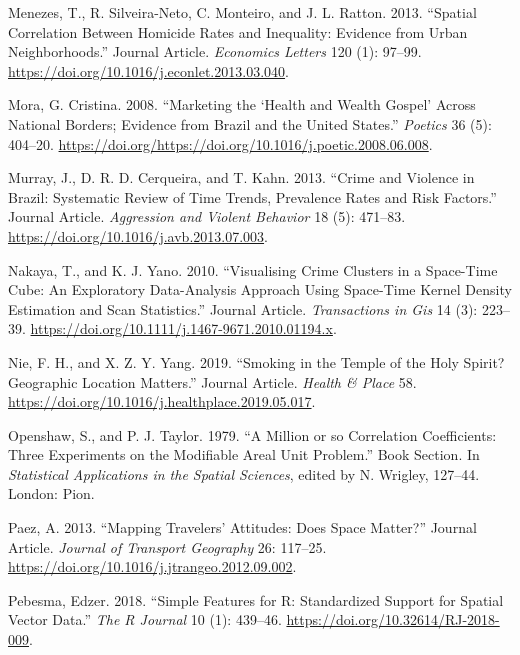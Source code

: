 \documentclass[smallextended]{svjour3}       %
\begin{document}
\leavevmode\hypertarget{ref-Menezes2013spatial}{}%
Menezes, T., R. Silveira-Neto, C. Monteiro, and J. L. Ratton. 2013.
``Spatial Correlation Between Homicide Rates and Inequality: Evidence
from Urban Neighborhoods.'' Journal Article. \emph{Economics Letters}
120 (1): 97--99. \url{https://doi.org/10.1016/j.econlet.2013.03.040}.

\leavevmode\hypertarget{ref-Mora2008marketing}{}%
Mora, G. Cristina. 2008. ``Marketing the `Health and Wealth Gospel'
Across National Borders; Evidence from Brazil and the United States.''
\emph{Poetics} 36 (5): 404--20.
\url{https://doi.org/https://doi.org/10.1016/j.poetic.2008.06.008}.

\leavevmode\hypertarget{ref-Murray2013crime}{}%
Murray, J., D. R. D. Cerqueira, and T. Kahn. 2013. ``Crime and Violence
in Brazil: Systematic Review of Time Trends, Prevalence Rates and Risk
Factors.'' Journal Article. \emph{Aggression and Violent Behavior} 18
(5): 471--83. \url{https://doi.org/10.1016/j.avb.2013.07.003}.

\leavevmode\hypertarget{ref-Nakaya2010visualizing}{}%
Nakaya, T., and K. J. Yano. 2010. ``Visualising Crime Clusters in a
Space-Time Cube: An Exploratory Data-Analysis Approach Using Space-Time
Kernel Density Estimation and Scan Statistics.'' Journal Article.
\emph{Transactions in Gis} 14 (3): 223--39.
\url{https://doi.org/10.1111/j.1467-9671.2010.01194.x}.

\leavevmode\hypertarget{ref-Nie2019smoking}{}%
Nie, F. H., and X. Z. Y. Yang. 2019. ``Smoking in the Temple of the Holy
Spirit? Geographic Location Matters.'' Journal Article. \emph{Health \&
Place} 58. \url{https://doi.org/10.1016/j.healthplace.2019.05.017}.

\leavevmode\hypertarget{ref-Openshaw1979million}{}%
Openshaw, S., and P. J. Taylor. 1979. ``A Million or so Correlation
Coefficients: Three Experiments on the Modifiable Areal Unit Problem.''
Book Section. In \emph{Statistical Applications in the Spatial
Sciences}, edited by N. Wrigley, 127--44. London: Pion.

\leavevmode\hypertarget{ref-Paez2013mapping}{}%
Paez, A. 2013. ``Mapping Travelers' Attitudes: Does Space Matter?''
Journal Article. \emph{Journal of Transport Geography} 26: 117--25.
\url{https://doi.org/10.1016/j.jtrangeo.2012.09.002}.

\leavevmode\hypertarget{ref-Pebesma2018simple}{}%
Pebesma, Edzer. 2018. ``Simple Features for R: Standardized Support for
Spatial Vector Data.'' \emph{The R Journal} 10 (1): 439--46.
\url{https://doi.org/10.32614/RJ-2018-009}.
\end{document}
